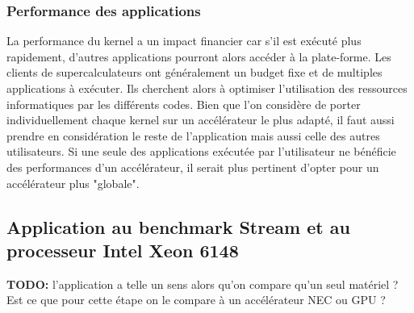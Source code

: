 \subsubsection{Performance des applications }
La performance du kernel a un impact financier car s'il est exécuté plus rapidement, d'autres applications pourront alors accéder à la plate-forme. Les clients de supercalculateurs ont généralement un budget fixe et de multiples applications à exécuter. Ils cherchent alors à optimiser l'utilisation des ressources informatiques par les différents codes. Bien que l'on considère de porter individuellement chaque kernel sur un accélérateur le plus adapté, il faut aussi prendre en considération le reste de l'application mais aussi celle des autres utilisateurs. Si une seule des applications exécutée par l'utilisateur ne bénéficie des performances d'un accélérateur, il serait plus pertinent d'opter pour un accélérateur plus "globale". 


\subsection{Application au benchmark Stream et au processeur Intel Xeon 6148}
 \textbf{TODO:} l'application a telle un sens alors qu'on compare qu'un seul matériel ? Est ce que pour cette étape on le compare à un accélérateur NEC ou GPU ?










